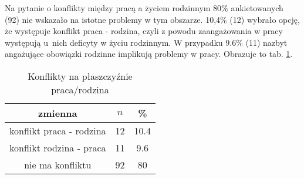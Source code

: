 Na pytanie o konflikty między pracą a życiem rodzinnym 80\% ankietowanych (92) nie wskazało na istotne problemy w tym obszarze. 10,4\% (12) wybrało opcję, że występuje konflikt praca - rodzina, czyli z powodu zaangażowania w pracy występują u~nich deficyty w życiu rodzinnym. W przypadku 9.6\% (11) nazbyt angażujące obowiązki rodzinne implikują problemy w pracy. Obrazuje to tab. \ref{tab:Q27}.

\begin{table}[H]
\caption{Konflikty na płaszczyźnie praca/rodzina}
\centering
\begin{tabular}{ | c | c | c |}
\hline
zmienna & $n$ & \% \\
\hline
konflikt praca - rodzina  &  12  & 10.4\\
\hline
konflikt rodzina - praca  &  11  & 9.6 \\
\hline
nie ma konfliktu  &  92  & 80 \\
\hline
\end{tabular}
\label{tab:Q27}
\end{table}
